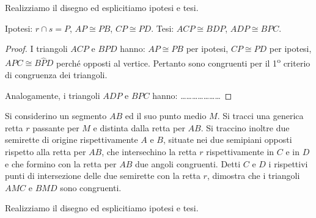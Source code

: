 \begin{exrig}
\begin{esempio}
\begin{multicols}{2}
Realizziamo il disegno ed esplicitiamo ipotesi e tesi.

\noindent Ipotesi: \(r\cap s=P\), \(AP\cong PB\), \(CP\cong PD\).\tab\tab 
Tesi: \(ACP\cong BDP\), \(ADP\cong BPC\).

\begin{proof}
I triangoli \(ACP\) e \(BPD\) hanno: \(AP\cong PB\) per ipotesi, \(CP\cong 
PD\) per ipotesi, \(A\widehat{P}C\cong B\widehat{P}D\) perché opposti al 
vertice. Pertanto sono congruenti per il 1\textsuperscript{o} 
criterio di congruenza dei triangoli.
\begin{center}
\begin{inaccessibleblock}

\end{inaccessibleblock}
\end{center}

Analogamente, i triangoli \(ADP\) e \(BPC\) hanno: 
\ldots\ldots\ldots\ldots\ldots\ldots\ldots
\end{proof}
\end{multicols}

\end{esempio}

\begin{esempio}\label{esempio:2.2}
Si considerino un segmento \(AB\) ed il suo punto medio \(M\). Si tracci 
una generica retta \(r\) passante per \(M\) e distinta dalla retta per 
\(AB\). Si traccino inoltre due semirette di origine rispettivamente 
\(A\) e \(B\), situate nei due semipiani opposti rispetto alla retta per 
\(AB\), che intersechino la retta \(r\) rispettivamente in \(C\) e in \(D\) e 
che formino con la retta per \(AB\) due angoli congruenti.
Detti \(C\) e \(D\) i rispettivi punti di 
intersezione delle due semirette con la retta \(r\), dimostra che i 
triangoli \(AMC\) e \(BMD\) sono congruenti.



\begin{multicols}{2}
Realizziamo il disegno ed esplicitiamo ipotesi e tesi.


\end{multicols}
\end{esempio}
\end{exrig}
